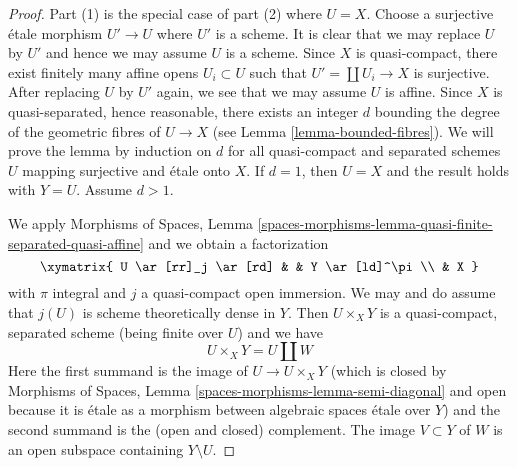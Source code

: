 \begin{proof}
Part (1) is the special case of part (2) where $U = X$.
Choose a surjective \'etale morphism $U' \to U$
where $U'$ is a scheme. It is clear that we may replace $U$ by $U'$
and hence we may assume $U$ is a scheme. Since $X$ is quasi-compact,
there exist finitely many affine opens $U_i \subset U$ such that
$U' = \coprod U_i \to X$ is surjective.
After replacing $U$ by $U'$ again, we see that we may assume $U$ is affine.
Since $X$ is quasi-separated, hence reasonable, there exists an integer
$d$ bounding the degree of the geometric fibres of $U \to X$
(see Lemma \ref{lemma-bounded-fibres}).
We will prove the lemma by induction on $d$ for all quasi-compact
and separated schemes $U$ mapping surjective and \'etale onto $X$.
If $d = 1$, then $U = X$ and the result holds with $Y = U$.
Assume $d > 1$.

\medskip\noindent
We apply Morphisms of Spaces, Lemma
\ref{spaces-morphisms-lemma-quasi-finite-separated-quasi-affine}
and we obtain a factorization
$$
\xymatrix{
U \ar[rr]_j \ar[rd] & & Y \ar[ld]^\pi \\
& X
}
$$
with $\pi$ integral and $j$ a quasi-compact open immersion. We may and do
assume that $j(U)$ is scheme theoretically dense in $Y$. Then $U \times_X Y$
is a quasi-compact, separated scheme (being finite over $U$) and we have
$$
U \times_X Y = U \amalg W
$$
Here the first summand is the image of $U \to U \times_X Y$
(which is closed by
Morphisms of Spaces, Lemma \ref{spaces-morphisms-lemma-semi-diagonal}
and open because it is \'etale as a morphism between
algebraic spaces \'etale over $Y$) and
the second summand is the (open and closed) complement.
The image $V \subset Y$ of $W$ is an open subspace containing
$Y \setminus U$.


\end{proof}
